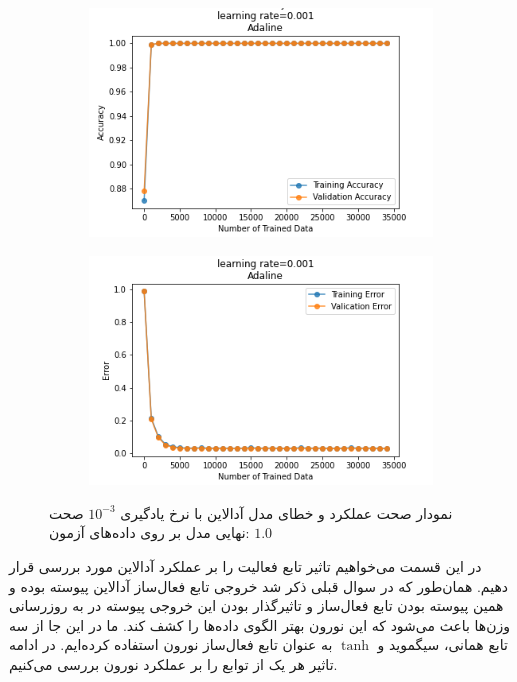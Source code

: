 \documentclass[12pt, a4paper]{article}
\begin{document}
\begin{figure}[h]
    \begin{subfigure}{0.45\linewidth}
        \centering
        \includegraphics[width=\linewidth]{images/3/adaline/lr/acc_0.001.png}
    \end{subfigure}
    \hfil
    \begin{subfigure}{0.45\linewidth}
        \centering
        \includegraphics[width=\linewidth]{images/3/adaline/lr/error_0.001.png}
    \end{subfigure}
    \caption{نمودار صحت عملکرد‌ و خطای مدل آدالاین با نرخ یادگیری $10^{-3}$
    \newline
    صحت نهایی مدل بر روی داده‌های آزمون: $1.0$}
    \label{adaline_lr_1e3}
\end{figure}


در این قسمت می‌خواهیم تاثیر تابع فعالیت را بر عملکرد آدالاین مورد بررسی قرار دهیم.
همان‌طور که در سوال قبلی ذکر شد خروجی تابع فعال‌ساز آدالاین پیوسته بوده و همین پیوسته بودن
تابع فعال‌ساز و تاثیر‌گذار بودن این خروجی پیوسته در به روز‌رسانی وزن‌ها باعث می‌شود که این نورون
بهتر الگوی داده‌ها را کشف کند. ما در این جا از سه تابع همانی، سیگموید و $\tanh$ به عنوان تابع
فعال‌ساز نورون استفاده کرده‌ایم. در ادامه تاثیر هر یک از توابع را بر عملکرد نورون بررسی می‌کنیم.
\end{document}
